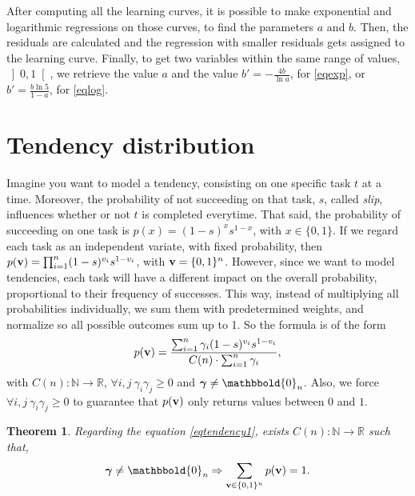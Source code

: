 \documentclass{article}
\newtheorem{theorem}{Theorem}
\newcommand{\0}{\mathbbold{0}}
\newcommand{\1}{\mathds{1}}
\newcommand{\2}{\mathbbold{2}}
\newcommand{\openinter}[2]{\left]#1,#2\right[}
\begin{document}
After computing all the learning curves, it is possible to make exponential and logarithmic regressions on those curves, to find the parameters $a$ and $b$.
Then, the residuals are calculated and the regression with smaller residuals gets assigned to the learning curve.
Finally, to get two variables within the same range of values, $\openinter{0}{1}$, we retrieve the value $a$ and the value $b'=-\frac{4b}{\ln a}$, for \eqref{eqexp}, or $b'=\frac{b\ln 5}{1-a}$, for \eqref{eqlog}.

\section{Tendency distribution}
Imagine you want to model a tendency, consisting on one specific task $t$ at a time. Moreover, the probability of not succeeding on that task, $s$, called \textsl{slip}, influences whether or not $t$ is completed everytime.
That said, the probability of succeeding on one task is $p(x) = (1-s)^{x}s^{1-x}$, with $x \in \{0,1\}$. If we regard each task as an independent variate, with fixed probability, then $p({\bf v}) = \prod_{i=1}^{n}(1-s)^{v_i}s^{1-v_i}$, with ${\bf v} = \{0,1\}^n$.
However, since we want to model tendencies, each task will have a different impact on the overall probability, proportional to their frequency of successes. This way, instead of multiplying all probabilities individually, we sum them with predetermined weights, and normalize so all possible outcomes sum up to 1.
So the formula is of the form
\begin{equation}
    p({\bf v}) = \frac{\sum_{i=1}^{n}\gamma_i(1-s)^{v_i}s^{1-v_i}}{C(n)\cdot\sum_{i=1}^{n}\gamma_i},\label{eqtendency1}
\end{equation}
with $C(n)\colon \mathbb{N} \longrightarrow \mathbb{R}$, $\forall i,j ~ \gamma_i\gamma_j \ge 0$ and ${\boldsymbol \gamma} \ne \0_n$. Also, we force $\forall i,j ~ \gamma_i\gamma_j \ge 0$ to guarantee that $p({\bf v})$ only returns values between $0$ and $1$.
\begin{theorem} \label{sumtheo}
    Regarding the equation \eqref{eqtendency1}, exists $C(n)\colon \mathbb{N} \longrightarrow \mathbb{R}$ such that,
    \begin{equation*}
        {\boldsymbol \gamma} \ne \0_n \Rightarrow \sum_{{\bf v} \in \{0,1\}^n}p({\bf v}) = 1.
    \end{equation*}
\end{theorem}
\end{document}
